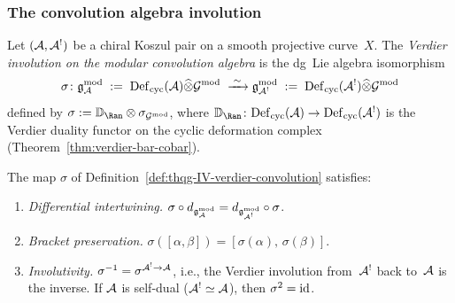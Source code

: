 \subsubsection{The convolution algebra involution}

\begin{definition}
\label{def:thqg-IV-verdier-convolution}
Let $(\mathcal{A}, \mathcal{A}^!)$ be a chiral Koszul pair on a smooth projective
curve~$X$. The \emph{Verdier involution on the modular
convolution algebra} is the dg~Lie algebra isomorphism
\begin{equation}\label{eq:thqg-IV-verdier-convolution}
\sigma\colon
\mathfrak{g}_{\mathcal{A}}^{\mathrm{mod}}
\;:=\;
\mathrm{Def}_{\mathrm{cyc}}(\mathcal{A}) \widehat{\otimes} \mathcal{G}^{\mathrm{mod}}
\;\xrightarrow{\;\sim\;}
\mathfrak{g}_{\mathcal{A}^!}^{\mathrm{mod}}
\;:=\;
\mathrm{Def}_{\mathrm{cyc}}(\mathcal{A}^!) \widehat{\otimes} \mathcal{G}^{\mathrm{mod}}
\end{equation}
defined by
$\sigma := \VD_{\Ran} \otimes \sigma_{\Gmod}$,
where $\VD_{\Ran}\colon \Defcyc(\cA) \to \Defcyc(\cA^!)$ is the
Verdier duality functor on the cyclic deformation complex
(Theorem~\ref{thm:verdier-bar-cobar}).
\end{definition}

\begin{proposition}
\label{prop:thqg-IV-verdier-dg-lie}
The map $\sigma$ of
Definition~\textup{\ref{def:thqg-IV-verdier-convolution}} satisfies:
\begin{enumerate}[label=\textup{(\alph*)}]
\item \emph{Differential intertwining.}
 $\sigma \circ d_{\mathfrak{g}_{\mathcal{A}}^{\mathrm{mod}}} = d_{\mathfrak{g}_{\mathcal{A}^!}^{\mathrm{mod}}} \circ \sigma$.
\item \emph{Bracket preservation.}
 $\sigma([\alpha, \beta]) = [\sigma(\alpha),\, \sigma(\beta)]$.
\item \emph{Involutivity.}
 $\sigma^{-1} = \sigma^{\mathcal{A}^! \to \mathcal{A}}$, i.e., the Verdier involution
 from~$\mathcal{A}^!$ back to~$\mathcal{A}$ is the inverse.
 If $\mathcal{A}$ is self-dual ($\mathcal{A}^! \simeq \mathcal{A}$), then $\sigma^2 = \mathrm{id}$.
\end{enumerate}
\end{proposition}

